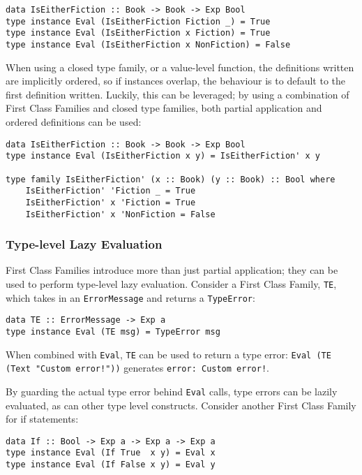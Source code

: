 \documentclass[12pt, a4paper, bibliography=totocnumbered]{scrreprt}
\newcommand{\inline}[1]{\lstinline[basicstyle=\ttfamily\footnotesize]{#1}}
\begin{document}
\begin{lstlisting}
data IsEitherFiction :: Book -> Book -> Exp Bool
type instance Eval (IsEitherFiction Fiction _) = True
type instance Eval (IsEitherFiction x Fiction) = True
type instance Eval (IsEitherFiction x NonFiction) = False
\end{lstlisting}

When using a closed type family, or a value-level function, the definitions written are implicitly ordered, so if instances overlap, the behaviour is to default to the first definition written. Luckily, this can be leveraged; by using a combination of First Class Families and closed type families, both partial application and ordered definitions can be used:

\begin{lstlisting}
data IsEitherFiction :: Book -> Book -> Exp Bool
type instance Eval (IsEitherFiction x y) = IsEitherFiction' x y

type family IsEitherFiction' (x :: Book) (y :: Book) :: Bool where
    IsEitherFiction' 'Fiction _ = True
    IsEitherFiction' x 'Fiction = True
    IsEitherFiction' x 'NonFiction = False
\end{lstlisting}

\subsubsection{Type-level Lazy Evaluation}

First Class Families introduce more than just partial application; they can be used to perform type-level lazy evaluation. Consider a First Class Family, \inline{TE}, which takes in an \inline{ErrorMessage} and returns a \inline{TypeError}:

\begin{lstlisting}
data TE :: ErrorMessage -> Exp a
type instance Eval (TE msg) = TypeError msg
\end{lstlisting}

When combined with \inline{Eval}, \inline{TE} can be used to return a type error: \inline{Eval (TE (Text "Custom error!"))} generates \inline{error: Custom error!}.

By guarding the actual type error behind \inline{Eval} calls, type errors can be lazily evaluated, as can other type level constructs. Consider another First Class Family for if statements:

\begin{lstlisting}
data If :: Bool -> Exp a -> Exp a -> Exp a
type instance Eval (If True  x y) = Eval x
type instance Eval (If False x y) = Eval y
\end{lstlisting}
\end{document}
